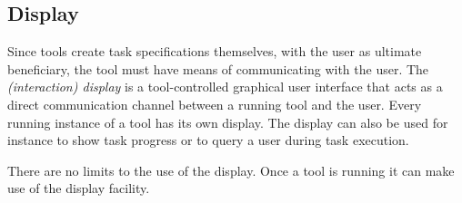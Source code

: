 \documentclass{article}
\begin{document}

  \subsection{Display}

   Since tools create task specifications themselves, with the user as ultimate
   beneficiary, the tool must have means of communicating with the user. The
   \textit{(interaction) display} is a tool-controlled graphical user interface
   that acts as a direct communication channel between a running tool and the
   user. Every running instance of a tool has its own display. The display can
   also be used for instance to show task progress or to query a user during
   task execution.

   There are no limits to the use of the display. Once a tool is running it can
   make use of the display facility.


\end{document}
